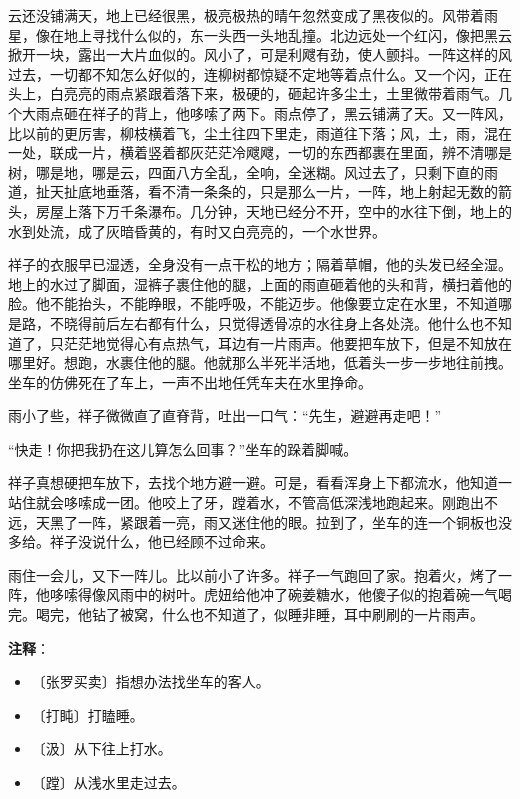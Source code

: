 \documentclass[12pt,UTF-8,openany]{ctexbook}
\begin{document}
\begin{normalsize}
    云还没铺满天，地上已经很黑，极亮极热的晴午忽然变成了黑夜似的。风带着雨星，像在地上寻找什么似的，东一头西一头地乱撞。北边远处一个红闪，像把黑云掀开一块，露出一大片血似的。风小了，可是利飕有劲，使人颤抖。一阵这样的风过去，一切都不知怎么好似的，连柳树都惊疑不定地等着点什么。又一个闪，正在头上，白亮亮的雨点紧跟着落下来，极硬的，砸起许多尘土，土里微带着雨气。几个大雨点砸在祥子的背上，他哆嗦了两下。雨点停了，黑云铺满了天。又一阵风，比以前的更厉害，柳枝横着飞，尘土往四下里走，雨道往下落；风，土，雨，混在一处，联成一片，横着竖着都灰茫茫冷飕飕，一切的东西都裹在里面，辨不清哪是树，哪是地，哪是云，四面八方全乱，全响，全迷糊。风过去了，只剩下直的雨道，扯天扯底地垂落，看不清一条条的，只是那么一片，一阵，地上射起无数的箭头，房屋上落下万千条瀑布。几分钟，天地已经分不开，空中的水往下倒，地上的水到处流，成了灰暗昏黄的，有时又白亮亮的，一个水世界。
    
    祥子的衣服早已湿透，全身没有一点干松的地方；隔着草帽，他的头发已经全湿。地上的水过了脚面，湿裤子裹住他的腿，上面的雨直砸着他的头和背，横扫着他的脸。他不能抬头，不能睁眼，不能呼吸，不能迈步。他像要立定在水里，不知道哪是路，不晓得前后左右都有什么，只觉得透骨凉的水往身上各处浇。他什么也不知道了，只茫茫地觉得心有点热气，耳边有一片雨声。他要把车放下，但是不知放在哪里好。想跑，水裹住他的腿。他就那么半死半活地，低着头一步一步地往前拽。坐车的仿佛死在了车上，一声不出地任凭车夫在水里挣命。
    
    雨小了些，祥子微微直了直脊背，吐出一口气：“先生，避避再走吧！”
    
    “快走！你把我扔在这儿算怎么回事？”坐车的跺着脚喊。
    
    祥子真想硬把车放下，去找个地方避一避。可是，看看浑身上下都流水，他知道一站住就会哆嗦成一团。他咬上了牙，蹚着水，不管高低深浅地跑起来。刚跑出不远，天黑了一阵，紧跟着一亮，雨又迷住他的眼。拉到了，坐车的连一个铜板也没多给。祥子没说什么，他已经顾不过命来。
    
    雨住一会儿，又下一阵儿。比以前小了许多。祥子一气跑回了家。抱着火，烤了一阵，他哆嗦得像风雨中的树叶。虎妞给他冲了碗姜糖水，他傻子似的抱着碗一气喝完。喝完，他钻了被窝，什么也不知道了，似睡非睡，耳中刷刷的一片雨声。
    
\end{normalsize}


\newpage

\textbf{注释}：

\vspace{-1em}

\begin{itemize}
    \setlength\itemsep{-0.2em}
    \item 〔张罗买卖〕指想办法找坐车的客人。
    \item 〔打盹〕打瞌睡。
    \item 〔汲〕从下往上打水。
    \item 〔蹚〕从浅水里走过去。
\end{itemize}
\end{document}
